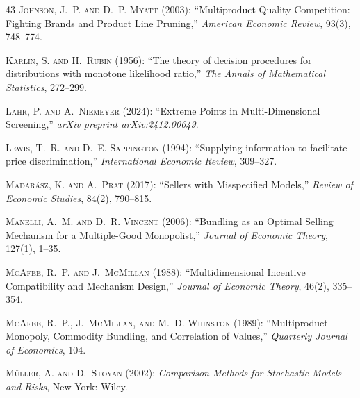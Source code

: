 \documentclass[12pt,letterpaper]{article}
\theoremstyle{plain}
\theoremstyle{definition}
\theoremstyle{remark}
\renewcommand{\1}{\mathds{1}}
\theoremstyle{definition}
\begin{document}
\begin{thebibliography}{43}
\textsc{Johnson, J.~P. and D.~P. Myatt} (2003): \enquote{Multiproduct Quality Competition: Fighting Brands and Product Line Pruning,} \emph{American Economic Review}, 93(3), 748--774.

\textsc{Karlin, S. and H.~Rubin} (1956): \enquote{The theory of decision procedures for distributions with monotone likelihood ratio,} \emph{The Annals of Mathematical Statistics}, 272--299.

\textsc{Lahr, P. and A.~Niemeyer} (2024): \enquote{Extreme Points in Multi-Dimensional Screening,} \emph{arXiv preprint arXiv:2412.00649}.

\textsc{Lewis, T.~R. and D.~E. Sappington} (1994): \enquote{Supplying information to facilitate price discrimination,} \emph{International Economic Review}, 309--327.

\textsc{Madar{\'a}sz, K. and A.~Prat} (2017): \enquote{Sellers with Misspecified Models,} \emph{Review of Economic Studies}, 84(2), 790--815.

\textsc{Manelli, A.~M. and D.~R. Vincent} (2006): \enquote{Bundling as an Optimal Selling Mechanism for a Multiple-Good Monopolist,} \emph{Journal of Economic Theory}, 127(1), 1--35.

\textsc{McAfee, R.~P. and J.~McMillan} (1988): \enquote{Multidimensional Incentive Compatibility and Mechanism Design,} \emph{Journal of Economic Theory}, 46(2), 335--354.

\textsc{McAfee, R.~P., J.~McMillan, and M.~D. Whinston} (1989): \enquote{{Multiproduct Monopoly, Commodity Bundling, and Correlation of Values},} \emph{Quarterly Journal of Economics}, 104.

\textsc{M{\"u}ller, A. and D.~Stoyan} (2002): \emph{Comparison Methods for Stochastic Models and Risks}, New York: Wiley.


\end{thebibliography}
\end{document}
